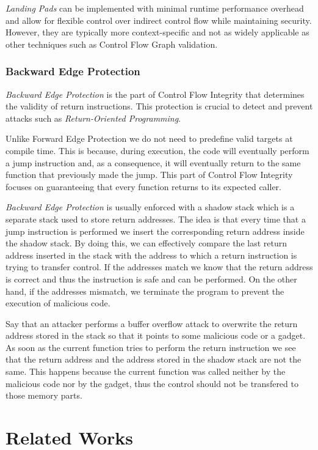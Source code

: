 \textit{Landing Pads} can be implemented with minimal runtime performance overhead
and allow for flexible control over indirect control flow while maintaining security.
However, they are typically more context-specific and not as widely applicable as
other techniques such as Control Flow Graph validation.

\subsubsection{Backward Edge Protection}
\label{subsubsec:background_backward}

\textit{Backward Edge Protection} is the part of Control Flow Integrity that determines
the validity of return instructions. This protection is crucial to detect and
prevent attacks such as \textit{Return-Oriented Programming}.

Unlike Forward Edge Protection we do not need to predefine valid targets at compile
time. This is because, during execution, the code will eventually perform a jump
instruction and, as a consequence, it will eventually return to the same
function that previously made the jump. This part of Control Flow Integrity focuses
on guaranteeing that every function returns to its expected caller.

\textit{Backward Edge Protection} is usually enforced with a shadow stack which
is a separate stack used to store return addresses. The idea is that every time that
a jump instruction is performed we insert the corresponding return address inside
the shadow stack. By doing this, we can effectively compare the last return address
inserted in the stack with the address to which a return instruction is trying to
transfer control. If the addresses match we know that the return address is
correct and thus the instruction is safe and can be performed. On the other hand,
if the addresses mismatch, we terminate the program to prevent the execution of malicious
code.

Say that an attacker performs a buffer overflow attack to overwrite the return address
stored in the stack so that it points to some malicious code or a gadget. As
soon as the current function tries to perform the return instruction we see that
the return address and the address stored in the shadow stack are not the same. This
happens because the current function was called neither by the malicious code nor
by the gadget, thus the control should not be transfered to those memory parts.

\section{Related Works}
\label{sec:background_related}

